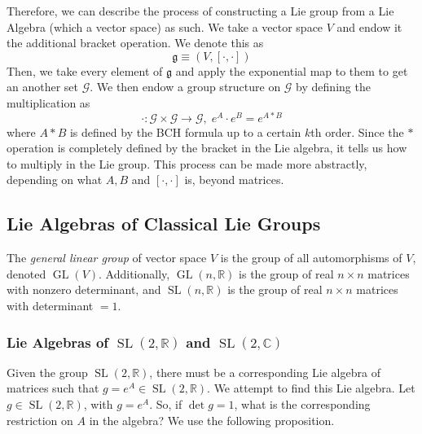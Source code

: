 \documentclass{article}
\DeclareMathOperator{\GL}{GL}
\DeclareMathOperator{\SL}{SL}
\begin{document}
    Therefore, we can describe the process of constructing a Lie group from a Lie Algebra (which a vector space) as such. We take a vector space $V$ and endow it the additional bracket operation. We denote this as
    \begin{equation}
      \mathfrak{g} \equiv (V, [\cdot, \cdot])
    \end{equation}
    Then, we take every element of $\mathfrak{g}$ and apply the exponential map to them to get an another set $\mathcal{G}$. We then endow a group structure on $\mathcal{G}$ by defining the multiplication as 
    \begin{equation}
      \cdot: \mathcal{G} \times \mathcal{G} \longrightarrow \mathcal{G}, \; e^A \cdot e^B = e^{A * B}
    \end{equation}
    where $A*B$ is defined by the BCH formula up to a certain $k$th order. Since the $*$ operation is completely defined by the bracket in the Lie algebra, it tells us how to multiply in the Lie group. This process can be made more abstractly, depending on what $A, B$ and $[\cdot,\cdot]$ is, beyond matrices. 

  \subsection{Lie Algebras of Classical Lie Groups}

    \begin{definition}
      The \textit{general linear group} of vector space $V$ is the group of all automorphisms of $V$, denoted $\GL(V)$. Additionally, $\GL(n, \mathbb{R})$ is the group of real $n \times n$ matrices with nonzero determinant, and $\SL(n, \mathbb{R})$ is the group of real $n \times n$ matrices with determinant $= 1$.
    \end{definition}

    \subsubsection[Lie Algebras of SL(2, R) and SL(2, C)]{Lie Algebras of $\SL(2, \mathbb{R})$ and $\SL(2, \mathbb{C})$}

      Given the group $\SL(2, \mathbb{R})$, there must be a corresponding Lie algebra of matrices such that $g = e^A \in \SL(2, \mathbb{R})$. We attempt to find this Lie algebra. Let $g \in \SL(2, \mathbb{R})$, with $g = e^A$. So, if $\det{g} = 1$, what is the corresponding restriction on $A$ in the algebra? We use the following proposition. 
\end{document}
